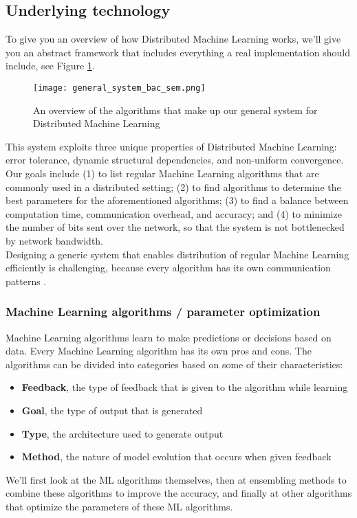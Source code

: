 \subsection{Underlying technology}
To give you an overview of how Distributed Machine Learning works, we'll give you an abstract framework that includes everything a real implementation should include, see Figure \ref{overview_system}.\\
\begin{figure}[H]
	\begin{center}
		\texttt{[image: general\_system\_bac\_sem.png]}
		\caption{An overview of the algorithms that make up our general system for Distributed Machine Learning}
		\label{overview_system}
	\end{center}
\end{figure}
\newpage
This system exploits three unique properties of Distributed Machine Learning: error tolerance, dynamic structural dependencies, and non-uniform convergence.\cite{Xing16}\\
Our goals include (1) to list regular Machine Learning algorithms that are commonly used in a distributed setting; (2) to find algorithms to determine the best parameters for the aforementioned algorithms; (3) to find a balance between computation time, communication overhead, and accuracy; and (4) to minimize the number of bits sent over the network, so that the system is not bottlenecked by network bandwidth.\\
Designing a generic system that enables distribution of  regular Machine Learning efficiently is challenging, because every algorithm has its own communication patterns \cite{Jia14}\cite{Newman09}\cite{Rich13}\cite{Smola10}\cite{Takac13}\cite{Tsi12}.

\subsubsection{Machine Learning algorithms / parameter optimization}
Machine Learning algorithms learn to make predictions or decisions based on data. Every Machine Learning algorithm has its own pros and cons. The algorithms can be divided into categories based on some of their characteristics:
\begin{itemize}
	\item \textbf{Feedback}, the type of feedback that is given to the algorithm while learning
	\item \textbf{Goal}, the type of output that is generated
	\item \textbf{Type}, the architecture used to generate output
	\item \textbf{Method}, the nature of model evolution that occurs when given feedback
\end{itemize}
We'll first look at the ML algorithms themselves, then at ensembling methods to combine these algorithms to improve the accuracy, and finally at other algorithms that optimize the parameters of these ML algorithms.

